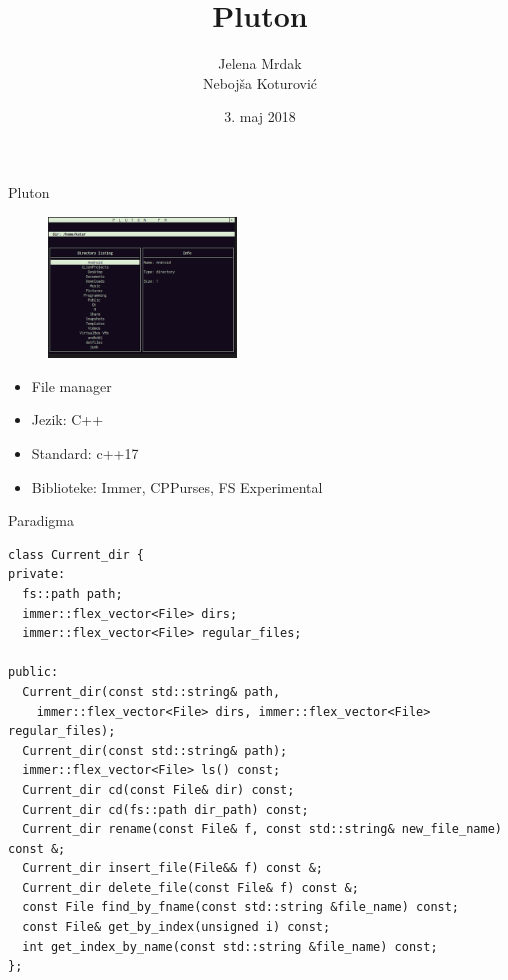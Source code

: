 \documentclass[12pt]{beamer}
\date{3. maj 2018}
\title{Pluton}
\author{Jelena Mrdak \\ Neboj\v sa Koturovi\' c}
\theoremstyle{definition}
\theoremstyle{remark}
\theoremstyle{plain}
\begin{document}
\begin{frame} 
\titlepage
\end{frame}

\begin{frame}{Pluton}
  \begin{figure}[H]
    \centering
    \includegraphics[width=5cm]{img/1.png}
  \end{figure}
  \begin{itemize}
    \item File manager 
    \item Jezik: C++
    \item Standard: c++17
    \item Biblioteke: Immer, CPPurses, FS Experimental
  \end{itemize}
\end{frame}
\usebackgroundtemplate{}


\begin{frame}[fragile]{Paradigma}
\lstset{language=C++,
    basicstyle=\tiny
}
  \begin{lstlisting}[mathescape=true]
class Current_dir {
private:
  fs::path path;
  immer::flex_vector<File> dirs;
  immer::flex_vector<File> regular_files;

public:
  Current_dir(const std::string& path, 
    immer::flex_vector<File> dirs, immer::flex_vector<File> regular_files);
  Current_dir(const std::string& path);
  immer::flex_vector<File> ls() const;
  Current_dir cd(const File& dir) const;
  Current_dir cd(fs::path dir_path) const;
  Current_dir rename(const File& f, const std::string& new_file_name) const &;
  Current_dir insert_file(File&& f) const &;
  Current_dir delete_file(const File& f) const &;
  const File find_by_fname(const std::string &file_name) const;
  const File& get_by_index(unsigned i) const;
  int get_index_by_name(const std::string &file_name) const;
};
  \end{lstlisting}
\end{frame}
\end{document}
